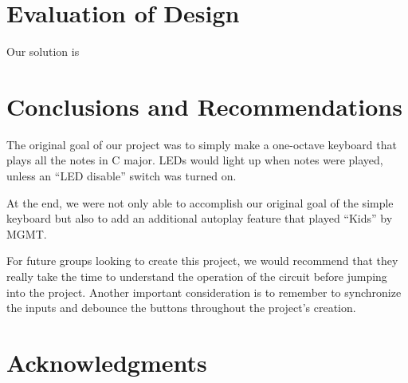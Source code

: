 \documentclass{article}
\begin{document}
\section{Evaluation of Design}
  

  Our solution is 

\section{Conclusions and Recommendations}


  The original goal of our project was to simply make a one-octave keyboard that plays all the notes in C major. LEDs would light up when notes were played, unless an ``LED disable'' switch was turned on.

  At the end, we were not only able to accomplish our original goal of the simple keyboard but also to add an additional autoplay feature that played ``Kids'' by MGMT.

  For future groups looking to create this project, we would recommend that they really take the time to understand the operation of the circuit before jumping into the project. Another important consideration is to remember to synchronize the inputs and debounce the buttons throughout the project's creation.

\newpage
\section{Acknowledgments}

  
\end{document}
